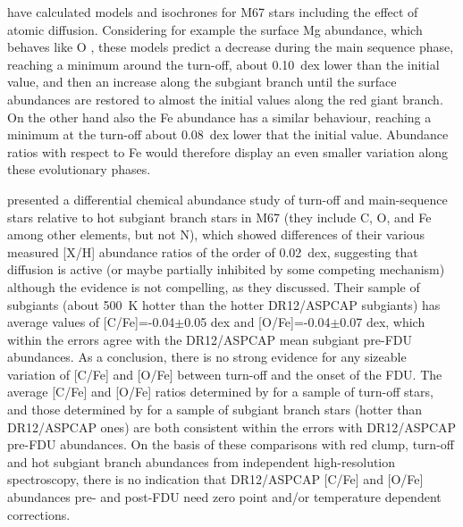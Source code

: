 \documentclass[a4paper,fleqn,usenatbib]{mnras}
\begin{document}
\citet{michaud2004} have calculated models and isochrones for M67 stars including the effect of atomic diffusion. Considering for example the surface Mg abundance, which behaves like O \citep{michaud2004}, these models predict a decrease during the main sequence phase, reaching a minimum around the turn-off, about 0.10~dex lower than the initial value, and then an increase along the subgiant branch until the surface abundances are restored to almost the initial values along the red giant branch. 
On the other hand also the Fe abundance has a similar behaviour, reaching a minimum at the turn-off about 0.08~dex lower that the initial value. Abundance ratios with respect to Fe would therefore display an even smaller variation along these evolutionary phases. 

\citet{onehag2014} presented a differential chemical abundance study of turn-off and main-sequence stars relative to hot subgiant 
branch stars in M67 (they include C, O, and Fe among other elements, but not N), which showed differences of their various measured [X/H] abundance ratios of the order of 0.02~dex, suggesting that diffusion is active (or maybe partially inhibited by some competing mechanism) although the evidence is not compelling, as they discussed. 
Their sample of subgiants (about 500~K hotter than the hotter DR12/ASPCAP subgiants) has average values of [C/Fe]=-0.04$\pm$0.05 dex and [O/Fe]=-0.04$\pm$0.07 dex, which within the errors agree with the DR12/ASPCAP mean subgiant pre-FDU abundances.
As a conclusion, there is no strong evidence for any sizeable variation of [C/Fe] and [O/Fe] between turn-off and the onset of the FDU. The average [C/Fe] and [O/Fe] ratios determined by \citet{shetrone2000} for a sample of turn-off stars, and those determined by \citet{onehag2014} for a sample of subgiant branch stars (hotter than DR12/ASPCAP ones) are both consistent within the errors with DR12/ASPCAP pre-FDU abundances. 
On the basis of these comparisons with red clump, turn-off and hot subgiant branch abundances from independent high-resolution spectroscopy, there is no indication that DR12/ASPCAP [C/Fe] and [O/Fe] abundances pre- and post-FDU need zero point and/or temperature dependent corrections.
\end{document}
